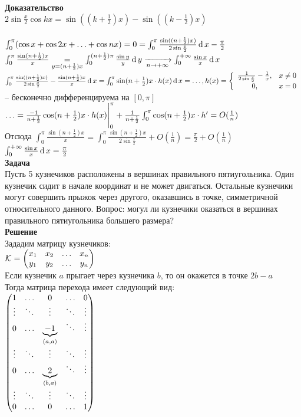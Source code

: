 \documentclass[12pt]{article}
\begin{document}
\textbf{Доказательство}\\
$2\sin \frac x2 \cos kx = \sin((k+\frac12)x) - \sin((k-\frac12)x)$\\\\
$\int_0^\pi (\cos x + \cos 2x + \ldots + \cos nx) = 0 = \int_0^\pi \frac{\sin((n+\frac12)x)}{2\sin \frac x2}\df x - \frac\pi2$\\
$\int_0^\pi \frac{\sin (n+\frac12)x}x \us{y=(n+\frac12)x}= \int_0^{(n+\frac12)\pi} \frac{\sin y}{y} \df y \xrto[n\rto +\infty]{} \int_0^{+\infty}\frac{\sin x}x \df x$\\
$\int_0^\pi \frac{\sin((n+\frac12)x)}{2\sin \frac x2} - \frac{\sin (n+\frac12)x}x \df x = \int_0^\pi \sin(n+\frac12)x \cdot h(x)\df x = \ldots, h(x) = \left\{\begin{array}{cc}
    \frac1{2\sin \frac x2} - \frac1x, & x \neq 0\\
    0, & x = 0
\end{array}\right.$ -- бесконечно дифференцируема на $[0, \pi]$\\
$\ldots = \frac{-1}{n+\frac12}\cos(n+\frac12)x\cdot h(x)\vl_0^\pi + \frac1{n+\frac12}\int_0^\pi \cos(n+\frac12)x\cdot h' = O(\frac1n)$\\
Отсюда $\int_0^\pi \frac{\sin (n+\frac12)x}{x} = \int_0^\pi \frac{\sin(n+\frac12)x}{2\sin \frac x2} + O(\frac1n)=\frac\pi2+O(\frac1n)$\\
$\int_0^{+\infty} \frac{\sin x}x \df x = \frac\pi2$\\
\textbf{Задача}\\
Пусть 5 кузнечиков расположены в вершинах правильного пятиугольника. Один кузнечик сидит в начале координат и не может двигаться. Остальные кузнечики могут совершить прыжок через другого, оказавшись в точке, симметричной относительного данного. Вопрос: могул ли кузнечики оказаться в вершинах правильного пятиугольника большего размера?\\
\textbf{Решение}\\
Зададим матрицу кузнечиков:\\
$\mc K = \begin{pmatrix}
    x_1 & x_2 & \ldots & x_n\\
    y_1 & y_2 & \ldots & y_n
\end{pmatrix}$\\
Если кузнечик $a$ прыгает через кузнечика $b$, то он окажется в точке $2b-a$\\
Тогда матрица перехода имеет следующий вид:\\
$\begin{pmatrix}
    1 & \ldots & 0 & \ldots & 0\\
    \vdots & \ddots & \vdots & \ddots & \vdots\\
    0 & \ldots & \ub{(a, a)}{-1} & \ddots & \vdots\\
    \vdots & \ddots & \vdots & \ddots & \vdots\\
    0 & \ldots & \ub{(b, a)}2 & \ddots & \vdots\\
    \vdots & \ddots & \vdots & \ddots & \vdots\\
    0 & \ldots & 0 & \ldots & 1\\
\end{pmatrix}$\\
\end{document}
